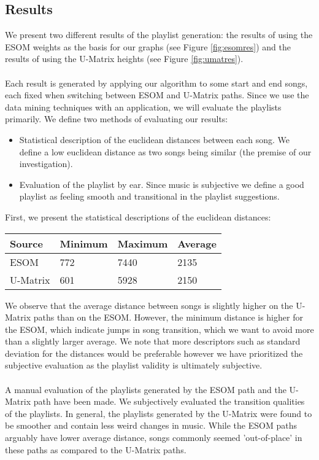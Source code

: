 \subsection{Results}

We present two different results of the playlist generation: the results of using the ESOM weights as the basis for our graphs (see Figure \ref{fig:esomres}) and the results of using the U-Matrix heights (see Figure \ref{fig:umatres}).
\\\\
Each result is generated by applying our algorithm to some start and end songs, each fixed when switching between ESOM and U-Matrix paths.
Since we use the data mining techniques with an application, we will evaluate the playlists primarily. We define two methods of evaluating our results:

\begin{itemize}
\item Statistical description of the euclidean distances between each song. We define a low euclidean distance as two songs being similar (the premise of our investigation).
\item Evaluation of the playlist by ear. Since music is subjective we define a good playlist as feeling smooth and transitional in the playlist suggestions.
\end{itemize}

First, we present the statistical descriptions of the euclidean distances: 

\begin{center}
    \begin{tabular}{  l | l | l | p{5cm} }
    Source & Minimum & Maximum & Average  \\ \hline
    ESOM & 772 & 7440 & 2135 \\ 
    U-Matrix & 601 & 5928 & 2150 \\ 
    \end{tabular}
\end{center}
\noindent
We observe that the average distance between songs is slightly higher on the U-Matrix paths than on the ESOM. However, the minimum distance is higher for the ESOM, which indicate jumps in song transition, which we want to avoid more than a slightly larger average. We note that more descriptors such as standard deviation for the distances would be  preferable however we have prioritized the subjective evaluation as the playlist validity is ultimately subjective.
\\\\
A manual evaluation of the playlists generated by the ESOM path and the U-Matrix path have been made. We subjectively evaluated the transition qualities of the playlists. In general, the playlists generated by the U-Matrix were found to be smoother and contain less weird changes in music. While the ESOM paths arguably have lower average distance, songs commonly seemed 'out-of-place' in these paths as compared to the U-Matrix paths.

